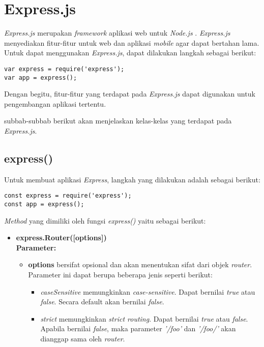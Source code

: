 
\section{Express.js}
\label{sec:Express.js}

\textit{Express.js} merupakan \textit{framework} aplikasi web untuk \textit{Node.js} \cite{expressjs}. \textit{Express.js} menyediakan fitur-fitur untuk web dan aplikasi \textit{mobile} agar dapat bertahan lama. Untuk dapat menggunakan \textit{Express.js}, dapat dilakukan langkah sebagai berikut: 
\begin{lstlisting}
var express = require('express');
var app = express();
\end{lstlisting}

Dengan begitu, fitur-fitur yang terdapat pada \textit{Express.js} dapat digunakan untuk pengembangan aplikasi tertentu.

subbab-subbab berikut akan menjelaskan kelas-kelas yang terdapat pada \textit{Express.js}.

\subsection{express()}
Untuk membuat aplikasi \textit{Express}, langkah yang dilakukan adalah sebagai berikut:
\begin{lstlisting}
const express = require('express');
const app = express();
\end{lstlisting}

\textit{Method} yang dimiliki oleh fungsi \textit{express()} yaitu sebagai berikut:

\begin{itemize}
	\item \textbf{express.Router([options])} \\ \textbf{Parameter:} 
	\begin{itemize}
		\item \textbf{options} bersifat opsional dan akan menentukan sifat dari objek \textit{router}. Parameter ini dapat berupa beberapa jenis seperti berikut:
		\begin{itemize}
			\item \textit{caseSensitive} memungkinkan \textit{case-sensitive}. Dapat bernilai \textit{true} atau \textit{false}. Secara default akan bernilai \textit{false}.
			
			\item \textit{strict} memungkinkan \textit{strict routing}. Dapat bernilai \textit{true} atau \textit{false}. Apabila bernilai \textit{false}, maka parameter \textit{'/foo'} dan \textit{'/foo/'} akan dianggap sama oleh \textit{router}.
		\end{itemize}
	\end{itemize}
	
\end{itemize}

